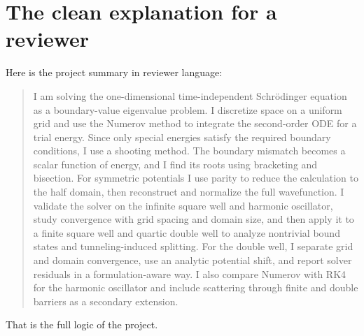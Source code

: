 \documentclass[11pt]{article}
\begin{document}
    \section{The clean explanation for a reviewer}

    Here is the project summary in reviewer language:

    \begin{quote}
    I am solving the one-dimensional time-independent Schr\"odinger equation as a boundary-value eigenvalue problem. I discretize space on a uniform grid and use the Numerov method to integrate the second-order ODE for a trial energy. Since only special energies satisfy the required boundary conditions, I use a shooting method. The boundary mismatch becomes a scalar function of energy, and I find its roots using bracketing and bisection. For symmetric potentials I use parity to reduce the calculation to the half domain, then reconstruct and normalize the full wavefunction. I validate the solver on the infinite square well and harmonic oscillator, study convergence with grid spacing and domain size, and then apply it to a finite square well and quartic double well to analyze nontrivial bound states and tunneling-induced splitting. For the double well, I separate grid and domain convergence, use an analytic potential shift, and report solver residuals in a formulation-aware way. I also compare Numerov with RK4 for the harmonic oscillator and include scattering through finite and double barriers as a secondary extension.
    \end{quote}

    That is the full logic of the project.
\end{document}
